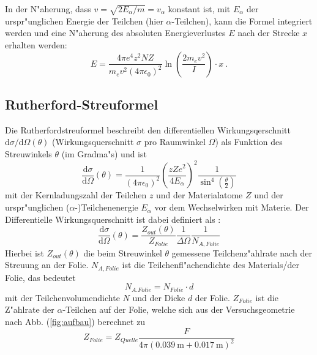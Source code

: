     In der N"aherung, dass $v=\sqrt{2E_{\alpha}/m}=v_{\alpha}$ konstant ist, mit $E_{\alpha}$ der urspr"unglichen Energie der Teilchen (hier $\alpha$-Teilchen), kann die Formel integriert werden und eine N"aherung des absoluten Energieverlustes $E$ nach der Strecke $x$ erhalten werden:
    \begin{equation}
      E = \frac{4\pi e^4z^2NZ}{m_ev^2(4\pi \epsilon_0)^2}\ln \left(\frac{2m_ev^2}{I}\right) \cdot x
      \label{bethe} \: .
    \end{equation}



  \subsection{Rutherford-Streuformel}
    Die Rutherfordstreuformel beschreibt den differentiellen Wirkungsqerschnitt $\text{d}\sigma/\text{d}\Omega(\theta)$ (Wirkungsquerschnitt $\sigma$ pro Raumwinkel $\Omega$) als Funktion des Streuwinkels $\theta$ (im Gradma"s) und ist
    \begin{equation}
      \frac{\text{d}\sigma}{\text{d}\Omega}(\theta) = \frac{1}{(4\pi \epsilon_0)^2} \left( \frac{zZe^2}{4E_{\alpha}} \right)^2 \frac{1}{\sin^4(\frac{\theta}{2})}
      \label{ruther}
    \end{equation}
    mit der Kernladungszahl der Teilchen $z$ und der Materialatome $Z$ und der urspr"unglichen ($\alpha$-)Teilchenenergie $E_{\alpha}$ vor dem Wechselwirken mit Materie.
    Der Differentielle Wirkungsquerschnitt ist dabei definiert als \cite{omega}:
    \begin{equation}
      \frac{\text{d}\sigma}{\text{d}\Omega}(\theta) = \frac{Z_{out}(\theta)}{Z_{Folie}} \frac{1}{\Delta \Omega} \frac{1}{N_{A,Folie}}
    \end{equation}
    Hierbei ist $Z_{out}(\theta)$ die beim Streuwinkel $\theta$ gemessene Teilchenz"ahlrate nach der Streuung an der Folie.
    $N_{A,Folie}$ ist die Teilchenfl"achendichte des Materials/der Folie, das bedeutet
    \begin{equation}
      N_{A.Folie} = N_{Folie} \cdot d
    \end{equation}
    mit der Teilchenvolumendichte $N$ und der Dicke $d$ der Folie.
    $Z_{Folie}$ ist die Z"ahlrate der $\alpha$-Teilchen auf der Folie, welche sich aus der Versuchsgeometrie nach Abb. (\ref{fig:aufbau}) berechnet zu
    \begin{equation}
      Z_{Folie}=Z_{Quelle}\frac{F}{4\pi(\SI{0.039}{\meter}+\SI{0,017}{\meter})^2}
    \end{equation}
